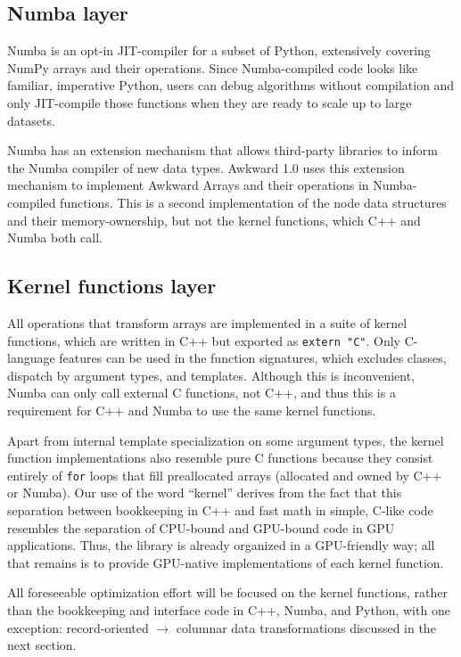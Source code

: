\documentclass{webofc}
\begin{document}
\subsection{Numba layer}

Numba is an opt-in JIT-compiler for a subset of Python, extensively covering NumPy arrays and their operations. Since Numba-compiled code looks like familiar, imperative Python, users can debug algorithms without compilation and only JIT-compile those functions when they are ready to scale up to large datasets.

Numba has an extension mechanism that allows third-party libraries to inform the Numba compiler of new data types. Awkward 1.0 uses this extension mechanism to implement Awkward Arrays and their operations in Numba-compiled functions. This is a second implementation of the node data structures and their memory-ownership, but not the kernel functions, which C++ and Numba both call.

\subsection{Kernel functions layer}

All operations that transform arrays are implemented in a suite of kernel functions, which are written in C++ but exported as \texttt{extern "C"}. Only C-language features can be used in the function signatures, which excludes classes, dispatch by argument types, and templates. Although this is inconvenient, Numba can only call external C functions, not C++, and thus this is a requirement for C++ and Numba to use the same kernel functions.

Apart from internal template specialization on some argument types, the kernel function implementations also resemble pure C functions because they consist entirely of \texttt{for} loops that fill preallocated arrays (allocated and owned by C++ or Numba). Our use of the word ``kernel'' derives from the fact that this separation between bookkeeping in C++ and fast math in simple, C-like code resembles the separation of CPU-bound and GPU-bound code in GPU applications. Thus, the library is already organized in a GPU-friendly way; all that remains is to provide GPU-native implementations of each kernel function.

All foreseeable optimization effort will be focused on the kernel functions, rather than the bookkeeping and interface code in C++, Numba, and Python, with one exception: record-oriented $\to$ columnar data transformations discussed in the next section.
\end{document}
